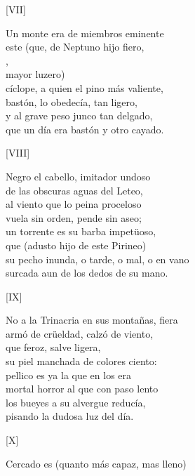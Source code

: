 \documentclass[11pt,a4paper,twoside]{article}
\begin{document}
%
\begin{center}
	[VII]
\end{center}\pstart
Un monte era de miembros eminente\\
este (que, de Neptuno hijo fiero,\\
,\\
 mayor luzero)\\
cíclope, a quien el pino más valiente,\\
bastón, lo obedecía, tan ligero,\\
y al grave peso junco tan delgado,\\
que un día era bastón y otro cayado.\par\pend
%
\begin{center}
	[VIII]
\end{center}\pstart
Negro el cabello, imitador undoso\\
de las obscuras aguas del Leteo,\\
al viento que lo peina proceloso\\
vuela sin orden, pende sin aseo;\\
un torrente es su barba impetüoso,\\
que (adusto hijo de este Pirineo)\\
su pecho inunda, o tarde, o mal, o en vano\\
surcada aun de los dedos de su mano.\par\pend
%
\begin{center}
	[IX]
\end{center}\pstart
No a la Trinacria en sus montañas, fiera\\
armó de crüeldad, calzó de viento,\\
que  feroz, salve ligera,\\
su piel manchada de colores ciento:\\
pellico es ya la que en los  era\\
mortal horror al que con paso lento\\
los bueyes a su alvergue reducía,\\
pisando la dudosa luz del día.\par\pend
%
\begin{center}
	[X]
\end{center}\pstart
Cercado es (quanto más capaz, mas lleno)\\
\end{document}
